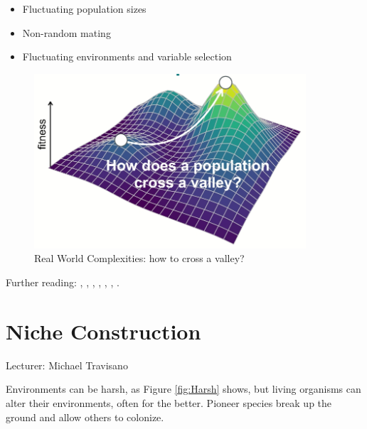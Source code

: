 \documentclass[]{article}
\begin{document}
\begin{itemize}
	\item  Fluctuating population sizes
	\item  Non-random mating
	\item  Fluctuating environments and variable
	selection
\end{itemize}
\begin{figure}[H]
	\caption{Real World Complexities: how to cross a valley?}\label{fig:RealWorldComplexities}
	\includegraphics[width=0.9\textwidth]{RealWorldComplexities}
\end{figure}

Further reading: \cite{gillespie1984molecular}, \cite{kauffman1989nk}, \cite{kimura1983neutral}, \cite{kingman2000origins}, \cite{patwa2008fixation}, \cite{poelwijk2007empirical}, \cite{rosenberg2002genealogical}.

\section{Niche Construction}

Lecturer: Michael Travisano

Environments can be harsh, as Figure \ref{fig:Harsh} shows, but living organisms can alter their environments, often for the better. Pioneer species break up the ground and allow others to colonize. 
\end{document}
